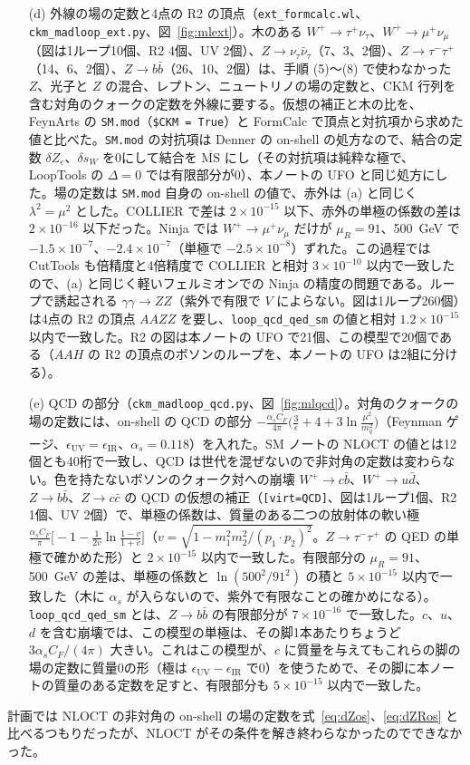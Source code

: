 \documentclass[a4paper,10pt]{ltjsarticle}
\newcommand{\MSbar}{\overline{\mathrm{MS}}}
\begin{document}
\begin{itemize}
\item[(d)] 外線の場の定数と4点の R2 の頂点（\texttt{ext\_formcalc.wl}、\texttt{ckm\_madloop\_ext.py}、図~\ref{fig:mlext}）。木のある $W^+\to\tau^+\nu_\tau$、$W^+\to\mu^+\nu_\mu$（図は1ループ10個、R2 4個、UV 2個）、$Z\to\nu_\tau\bar\nu_\tau$（7、3、2個）、$Z\to\tau^-\tau^+$（14、6、2個）、$Z\to b\bar b$（26、10、2個）は、手順 (5)〜(8) で使わなかった $Z$、光子と $Z$ の混合、レプトン、ニュートリノの場の定数と、CKM 行列を含む対角のクォークの定数を外線に要する。仮想の補正と木の比を、FeynArts の \texttt{SM.mod}（\texttt{\$CKM = True}）と FormCalc で頂点と対抗項から求めた値と比べた。\texttt{SM.mod} の対抗項は Denner の on-shell の処方なので、結合の定数 $\delta Z_e$、$\delta s_W$ を0にして結合を $\MSbar$ にし（その対抗項は純粋な極で、LoopTools の $\Delta=0$ では有限部分が0）、本ノートの UFO と同じ処方にした。場の定数は \texttt{SM.mod} 自身の on-shell の値で、赤外は (a) と同じく $\lambda^2=\mu^2$ とした。COLLIER で差は $2\times10^{-15}$ 以下、赤外の単極の係数の差は $2\times10^{-16}$ 以下だった。Ninja では $W^+\to\mu^+\nu_\mu$ だけが $\mu_R=91$、500~GeV で $-1.5\times10^{-7}$、$-2.4\times10^{-7}$（単極で $-2.5\times10^{-8}$）ずれた。この過程では CutTools も倍精度と4倍精度で COLLIER と相対 $3\times10^{-10}$ 以内で一致したので、(a) と同じく軽いフェルミオンでの Ninja の精度の問題である。ループで誘起される $\gamma\gamma\to ZZ$（紫外で有限で $V$ によらない。図は1ループ260個）は4点の R2 の頂点 $AAZZ$ を要し、\texttt{loop\_qcd\_qed\_sm} の値と相対 $1.2\times10^{-15}$ 以内で一致した。R2 の図は本ノートの UFO で21個、この模型で20個である（$AAH$ の R2 の頂点のボソンのループを、本ノートの UFO は2組に分ける）。
\item[(e)] QCD の部分（\texttt{ckm\_madloop\_qcd.py}、図~\ref{fig:mlqcd}）。対角のクォークの場の定数には、on-shell の QCD の部分 $-\frac{\alpha_sC_F}{4\pi}\bigl(\frac3\epsilon+4+3\ln\frac{\mu^2}{m_q^2}\bigr)$（Feynman ゲージ、$\epsilon_{\mathrm{UV}}=\epsilon_{\mathrm{IR}}$、$\alpha_s=0.118$）を入れた。SM ノートの NLOCT の値とは12個とも40桁で一致し、QCD は世代を混ぜないので非対角の定数は変わらない。色を持たないボソンのクォーク対への崩壊 $W^+\to c\bar b$、$W^+\to u\bar d$、$Z\to b\bar b$、$Z\to c\bar c$ の QCD の仮想の補正（\texttt{[virt=QCD]}、図は1ループ1個、R2 1個、UV 2個）で、単極の係数は、質量のある二つの放射体の軟い極 $\frac{\alpha_sC_F}\pi\bigl[-1-\frac1{2v}\ln\frac{1-v}{1+v}\bigr]$（$v=\sqrt{1-m_1^2m_2^2/(p_1\cdot p_2)^2}$。$Z\to\tau^-\tau^+$ の QED の単極で確かめた形）と $2\times10^{-15}$ 以内で一致した。有限部分の $\mu_R=91$、500~GeV の差は、単極の係数と $\ln(500^2/91^2)$ の積と $5\times10^{-15}$ 以内で一致した（木に $\alpha_s$ が入らないので、紫外で有限なことの確かめになる）。\texttt{loop\_qcd\_qed\_sm} とは、$Z\to b\bar b$ の有限部分が $7\times10^{-16}$ で一致した。$c$、$u$、$d$ を含む崩壊では、この模型の単極は、その脚1本あたりちょうど $3\alpha_sC_F/(4\pi)$ 大きい。これはこの模型が、$c$ に質量を与えてもこれらの脚の場の定数に質量0の形（極は $\epsilon_{\mathrm{UV}}-\epsilon_{\mathrm{IR}}$ で0）を使うためで、その脚に本ノートの質量のある定数を足すと、有限部分も $5\times10^{-15}$ 以内で一致した。
\end{itemize}
計画では NLOCT の非対角の on-shell の場の定数を式~\eqref{eq:dZos}、\eqref{eq:dZRos} と比べるつもりだったが、NLOCT がその条件を解き終わらなかったのでできなかった。
\end{document}
